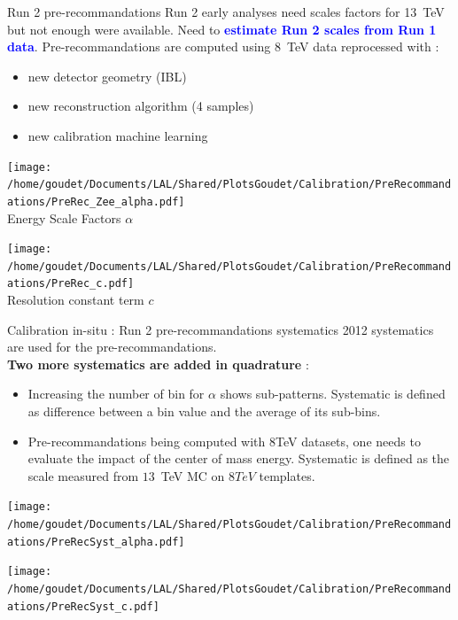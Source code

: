\begin{frame}{Run 2 pre-recommandations}
  Run 2 early analyses need scales factors for 13~TeV but not enough were available.
  Need to \textcolor{blue}{ \bf estimate Run 2 scales from Run 1 data}.
  \newline
  Pre-recommandations are computed using $8$~TeV data reprocessed with :
  \begin{itemize}
  \item new detector geometry (IBL)
  \item new reconstruction algorithm (4 samples)
  \item new calibration machine learning
  \end{itemize} 
  \begin{minipage}{0.49\linewidth}
    \centering
    \texttt{[image: /home/goudet/Documents/LAL/Shared/PlotsGoudet/Calibration/PreRecommandations/PreRec\_Zee\_alpha.pdf]}\\
    Energy Scale Factors $\alpha$

  \end{minipage}
  \begin{minipage}{0.49\linewidth}
    \centering
    \texttt{[image: /home/goudet/Documents/LAL/Shared/PlotsGoudet/Calibration/PreRecommandations/PreRec\_c.pdf]}\\
    Resolution constant term $c$
  \end{minipage}
\end{frame}


\begin{frame}{Calibration in-situ : Run 2 pre-recommandations systematics}
2012 systematics are used for the pre-recommandations. \\
{\bf Two more systematics are added in quadrature } :
\begin{itemize}
\item Increasing the number of bin for $\alpha$ shows sub-patterns. 
  Systematic is defined as difference between a bin value and the average of its sub-bins.
\item Pre-recommandations being computed with 8TeV datasets, one needs to evaluate the impact of the center of mass energy.
Systematic is defined as the scale measured from $13$~TeV MC on $8TeV$ templates.
\end{itemize}
  \begin{minipage}{0.49\linewidth}
    \texttt{[image: /home/goudet/Documents/LAL/Shared/PlotsGoudet/Calibration/PreRecommandations/PreRecSyst\_alpha.pdf]}
  \end{minipage}
  \hfill
  \begin{minipage}{0.49\linewidth}
    \texttt{[image: /home/goudet/Documents/LAL/Shared/PlotsGoudet/Calibration/PreRecommandations/PreRecSyst\_c.pdf]}
  \end{minipage}\\
\end{frame}

